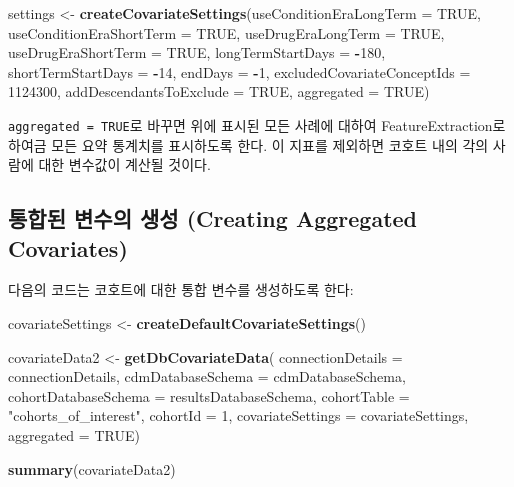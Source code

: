 \documentclass[11pt]{book}
\newenvironment{Shaded}{\begin{snugshade}}{\end{snugshade}}
\newcommand{\KeywordTok}[1]{\textcolor[rgb]{0.13,0.29,0.53}{\textbf{#1}}}
\newcommand{\DataTypeTok}[1]{\textcolor[rgb]{0.13,0.29,0.53}{#1}}
\newcommand{\DecValTok}[1]{\textcolor[rgb]{0.00,0.00,0.81}{#1}}
\newcommand{\StringTok}[1]{\textcolor[rgb]{0.31,0.60,0.02}{#1}}
\newcommand{\OtherTok}[1]{\textcolor[rgb]{0.56,0.35,0.01}{#1}}
\newcommand{\OperatorTok}[1]{\textcolor[rgb]{0.81,0.36,0.00}{\textbf{#1}}}
\newcommand{\NormalTok}[1]{#1}
\theoremstyle{definition}
\theoremstyle{definition}
\theoremstyle{definition}
\theoremstyle{remark}
\let\BeginKnitrBlock\begin \let\EndKnitrBlock\end
\begin{document}
\begin{Shaded}
\begin{Highlighting}[]
\NormalTok{settings <-}\StringTok{ }\KeywordTok{createCovariateSettings}\NormalTok{(}\DataTypeTok{useConditionEraLongTerm =} \OtherTok{TRUE}\NormalTok{, }
                                    \DataTypeTok{useConditionEraShortTerm =} \OtherTok{TRUE}\NormalTok{, }
                                    \DataTypeTok{useDrugEraLongTerm =} \OtherTok{TRUE}\NormalTok{, }
                                    \DataTypeTok{useDrugEraShortTerm =} \OtherTok{TRUE}\NormalTok{, }
                                    \DataTypeTok{longTermStartDays =} \OperatorTok{-}\DecValTok{180}\NormalTok{, }
                                    \DataTypeTok{shortTermStartDays =} \OperatorTok{-}\DecValTok{14}\NormalTok{, }
                                    \DataTypeTok{endDays =} \OperatorTok{-}\DecValTok{1}\NormalTok{, }
                                    \DataTypeTok{excludedCovariateConceptIds =} \DecValTok{1124300}\NormalTok{, }
                                    \DataTypeTok{addDescendantsToExclude =} \OtherTok{TRUE}\NormalTok{, }
                                    \DataTypeTok{aggregated =} \OtherTok{TRUE}\NormalTok{) }
\end{Highlighting}
\end{Shaded}

\BeginKnitrBlock{rmdimportant}
\texttt{aggregated\ =\ TRUE}로 바꾸면 위에 표시된 모든 사례에 대하여
FeatureExtraction로 하여금 모든 요약 통계치를 표시하도록 한다. 이 지표를
제외하면 코호트 내의 각의 사람에 대한 변수값이 계산될 것이다.
\EndKnitrBlock{rmdimportant}

\subsection{통합된 변수의 생성 (Creating Aggregated
Covariates)}\label{---creating-aggregated-covariates}

다음의 코드는 코호트에 대한 통합 변수를 생성하도록 한다:

\begin{Shaded}
\begin{Highlighting}[]
\NormalTok{covariateSettings <-}\StringTok{ }\KeywordTok{createDefaultCovariateSettings}\NormalTok{() }

\NormalTok{covariateData2 <-}\StringTok{ }\KeywordTok{getDbCovariateData}\NormalTok{(}
  \DataTypeTok{connectionDetails =}\NormalTok{ connectionDetails, }
  \DataTypeTok{cdmDatabaseSchema =}\NormalTok{ cdmDatabaseSchema, }
  \DataTypeTok{cohortDatabaseSchema =}\NormalTok{ resultsDatabaseSchema, }
  \DataTypeTok{cohortTable =} \StringTok{"cohorts_of_interest"}\NormalTok{, }
  \DataTypeTok{cohortId =} \DecValTok{1}\NormalTok{, }
  \DataTypeTok{covariateSettings =}\NormalTok{ covariateSettings, }
  \DataTypeTok{aggregated =} \OtherTok{TRUE}\NormalTok{) }

\KeywordTok{summary}\NormalTok{(covariateData2) }
\end{Highlighting}
\end{Shaded}
\end{document}
